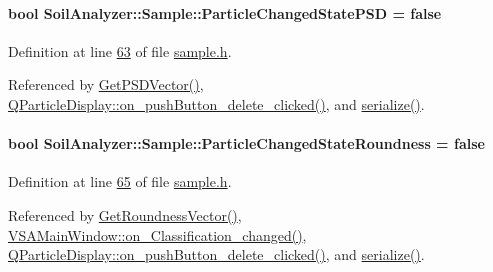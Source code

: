 \hypertarget{class_soil_analyzer_1_1_sample_af35befb868658ac10fe18fb544000377}{}
\paragraph[{Particle\+Changed\+State\+P\+S\+D}]{\setlength{\rightskip}{0pt plus 5cm}bool Soil\+Analyzer\+::\+Sample\+::\+Particle\+Changed\+State\+P\+S\+D = false}\label{class_soil_analyzer_1_1_sample_af35befb868658ac10fe18fb544000377}


Definition at line \hyperlink{sample_8h_source_l00063}{63} of file \hyperlink{sample_8h_source}{sample.\+h}.



Referenced by \hyperlink{sample_8cpp_source_l00061}{Get\+P\+S\+D\+Vector()}, \hyperlink{qparticledisplay_8cpp_source_l00096}{Q\+Particle\+Display\+::on\+\_\+push\+Button\+\_\+delete\+\_\+clicked()}, and \hyperlink{sample_8h_source_l00085}{serialize()}.

\hypertarget{class_soil_analyzer_1_1_sample_af2ed93f3cbdc06660e7b846bd4feb7fc}{}
\paragraph[{Particle\+Changed\+State\+Roundness}]{\setlength{\rightskip}{0pt plus 5cm}bool Soil\+Analyzer\+::\+Sample\+::\+Particle\+Changed\+State\+Roundness = false}\label{class_soil_analyzer_1_1_sample_af2ed93f3cbdc06660e7b846bd4feb7fc}


Definition at line \hyperlink{sample_8h_source_l00065}{65} of file \hyperlink{sample_8h_source}{sample.\+h}.



Referenced by \hyperlink{sample_8cpp_source_l00083}{Get\+Roundness\+Vector()}, \hyperlink{vsamainwindow_8cpp_source_l00522}{V\+S\+A\+Main\+Window\+::on\+\_\+\+Classification\+\_\+changed()}, \hyperlink{qparticledisplay_8cpp_source_l00096}{Q\+Particle\+Display\+::on\+\_\+push\+Button\+\_\+delete\+\_\+clicked()}, and \hyperlink{sample_8h_source_l00085}{serialize()}.

